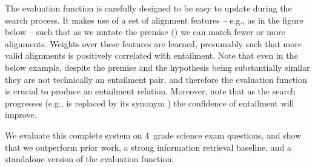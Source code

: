 The evaluation function is carefully designed to be easy to update during the search
  process.
It makes use of a set of alignment features -- e.g., as in the figure below -- such that
  as we mutate the premise () we can match
  fewer or more alignments.
Weights over these features are learned, presumably such that more valid alignments
  is positively correlated with entailment.
Note that even in the below example, despite the premise and the hypothesis being substantially
  similar they are not technically an entailment pair, and therefore the evaluation function is crucial
  to produce an entailment relation.
Moreover, note that as the search progresses (e.g.,  is replaced by its synonym )
  the confidence of entailment will improve.

\begin{center}
\end{center}


We evaluate this complete system on 4\nth\ grade science exam questions, and show that we 
  outperform prior work, a strong information retrieval baseline, and a 
  standalone version of the evaluation function.



